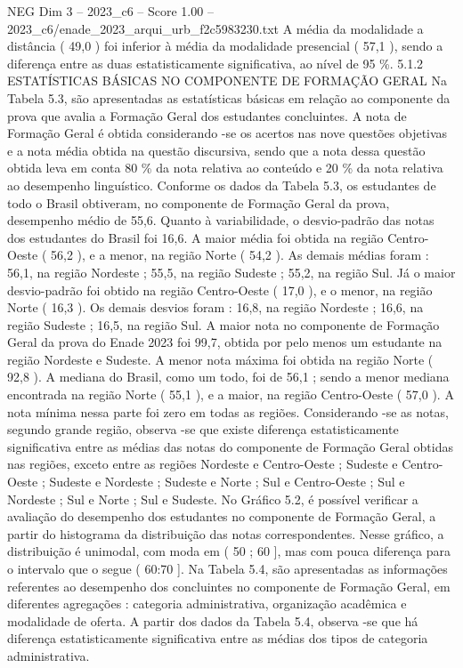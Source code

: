 \begin{textsample}{NEG Dim 3 – 2023\_c6 – Score 1.00 – 2023\_c6/enade\_2023\_arqui\_urb\_f2c5983230.txt}
A média da modalidade a distância ( 49,0 ) foi inferior à média da modalidade presencial ( 57,1 ), sendo a diferença entre as duas estatisticamente significativa, ao nível de 95 \%. 5.1.2 ESTATÍSTICAS BÁSICAS NO COMPONENTE DE FORMAÇÃO GERAL Na Tabela 5.3, são apresentadas as estatísticas básicas em relação ao componente da prova que avalia a Formação Geral dos estudantes concluintes.
A nota de Formação Geral é obtida considerando -se os acertos nas nove questões objetivas e a nota média obtida na questão discursiva, sendo que a nota dessa questão obtida leva em conta 80 \% da nota relativa ao conteúdo e 20 \% da nota relativa ao desempenho linguístico.
Conforme os dados da Tabela 5.3, os estudantes de todo o Brasil obtiveram, no componente de Formação Geral da prova, desempenho médio de 55,6.
Quanto à variabilidade, o desvio-padrão das notas dos estudantes do Brasil foi 16,6.
A maior média foi obtida na região Centro-Oeste ( 56,2 ), e a menor, na região Norte ( 54,2 ).
As demais médias foram : 56,1, na região Nordeste ; 55,5, na região Sudeste ; 55,2, na região Sul.
Já o maior desvio-padrão foi obtido na região Centro-Oeste ( 17,0 ), e o menor, na região Norte ( 16,3 ).
Os demais desvios foram : 16,8, na região Nordeste ; 16,6, na região Sudeste ; 16,5, na região Sul.
A maior nota no componente de Formação Geral da prova do Enade 2023 foi 99,7, obtida por pelo menos um estudante na região Nordeste e Sudeste.
A menor nota máxima foi obtida na região Norte ( 92,8 ).
A mediana do Brasil, como um todo, foi de 56,1 ; sendo a menor mediana encontrada na região Norte ( 55,1 ), e a maior, na região Centro-Oeste ( 57,0 ).
A nota mínima nessa parte foi zero em todas as regiões.
Considerando -se as notas, segundo grande região, observa -se que existe diferença estatisticamente significativa entre as médias das notas do componente de Formação Geral obtidas nas regiões, exceto entre as regiões Nordeste e Centro-Oeste ; Sudeste e Centro-Oeste ; Sudeste e Nordeste ; Sudeste e Norte ; Sul e Centro-Oeste ; Sul e Nordeste ; Sul e Norte ; Sul e Sudeste.
No Gráfico 5.2, é possível verificar a avaliação do desempenho dos estudantes no componente de Formação Geral, a partir do histograma da distribuição das notas correspondentes.
Nesse gráfico, a distribuição é unimodal, com moda em ( 50 ; 60 ], mas com pouca diferença para o intervalo que o segue ( 60:70 ].
Na Tabela 5.4, são apresentadas as informações referentes ao desempenho dos concluintes no componente de Formação Geral, em diferentes agregações : categoria administrativa, organização acadêmica e modalidade de oferta.
A partir dos dados da Tabela 5.4, observa -se que há diferença estatisticamente significativa entre as médias dos tipos de categoria administrativa.

\end{textsample}

